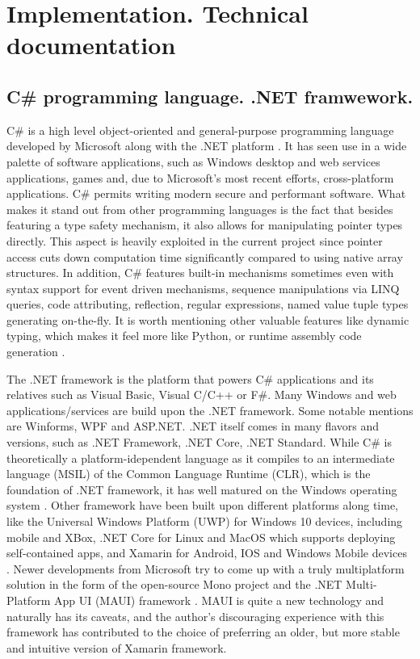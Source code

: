 \section{Implementation. Technical documentation}


\subsection{C\# programming language. .NET framwework.}

C\# is a high level object-oriented and general-purpose programming language developed by Microsoft along with the .NET platform \cite{csharp}. It has seen use in a wide palette of software applications, such as Windows desktop and web services applications, games and, due to Microsoft's most recent efforts, cross-platform applications. C\# permits writing modern secure and performant software. What makes it stand out from other programming languages is the fact that besides featuring a type safety mechanism, it also allows for manipulating pointer types directly. This aspect is heavily exploited in the current project since pointer access cuts down computation time significantly compared to using native array structures. In addition, C\# features built-in mechanisms sometimes even with syntax support for event driven mechanisms, sequence manipulations via LINQ queries, code attributing, reflection, regular expressions, named value tuple types generating on-the-fly. It is worth mentioning other valuable features like dynamic typing, which makes it feel more like Python, or runtime assembly code generation \cite{csharp70}. 

The .NET framework is the platform that powers C\# applications and its relatives such as Visual Basic, Visual C/C++ or F\#. Many Windows and web applications/services are build upon the .NET framework. Some notable mentions are Winforms\cite{winforms}, WPF and ASP.NET. .NET itself comes in many flavors and versions, such as .NET Framework, .NET Core, .NET Standard. While C\# is theoretically a platform-idependent language as it compiles to an intermediate language (MSIL) of the Common Language Runtime (CLR), which is the foundation of .NET framework, it has well matured on the Windows operating system \cite{csharp70}. Other framework have been built upon different platforms along time, like the Universal Windows Platform (UWP) for Windows 10 devices, including mobile and XBox, .NET Core for Linux and MacOS which supports deploying self-contained apps, and Xamarin for Android, IOS and Windows Mobile devices \cite{csharp70}. Newer developments from Microsoft try to come up with a truly multiplatform solution in the form of the open-source Mono project and the .NET Multi-Platform App UI (MAUI) framework \cite{MAUI}. MAUI is quite a new technology and naturally has its caveats, and the author's discouraging experience with this framework has contributed to the choice of preferring an older, but more stable and intuitive version of Xamarin framework.

